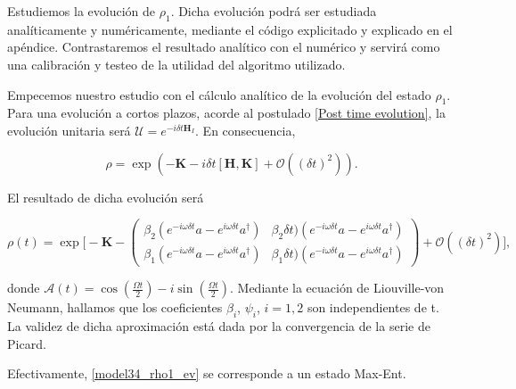 Estudiemos la evolución de $\rho_1$. Dicha evolución podrá ser estudiada analíticamente y numéricamente, mediante el código explicitado y explicado en el apéndice. Contrastaremos el resultado analítico con el numérico y servirá como una calibración y testeo de la utilidad del algoritmo utilizado.

Empecemos nuestro estudio con el cálculo analítico de la evolución del estado $\rho_1$. Para una evolución a cortos plazos, acorde al postulado \ref{Post time evolution}, la evolución unitaria será $\mathcal{U} = e^{-i\delta t \mathbf{H}_I}$. En consecuencia, 

\begin{equation}
    \rho = \exp (-\mathbf{K} - i\delta t [\mathbf{H},\mathbf{K}] + \mathcal{O}((\delta t)^2) ).
\end{equation}

El resultado de dicha evolución será

\begin{equation}
    \rho(t) = \exp \bigg[ -\mathbf{K} - \left(\begin{array}{cc}
        \beta_2 (e^{-i\omega \delta t}a-e^{i\omega \delta t}a^{\dagger}) & \beta_2 \delta t) (e^{-i\omega \delta t}a-e^{i\omega \delta t}a^{\dagger})  \\
        \beta_1 (e^{-i\omega \delta t}a-e^{i\omega \delta t}a^{\dagger}) & \beta_1 \delta t) (e^{-i\omega \delta t}a-e^{i\omega \delta t}a^{\dagger}) 
    \end{array}\right) + \mathcal{O}((\delta t)^2)
    \bigg],
    \label{model34_rho1_ev}
\end{equation}

donde $\mathcal{A}(t) = \cos \left(\frac{\Omega t}{2}\right) - i \sin\left(\frac{\Omega t}{2}\right)$. Mediante la ecuación de Liouville-von Neumann, hallamos que los coeficientes $\beta_i$, $\psi_i$, $i=1,2$ son independientes de t. La validez de dicha aproximación está dada por la convergencia de la serie de Picard. 

Efectivamente, \eqref{model34_rho1_ev} se corresponde a un estado Max-Ent. 

